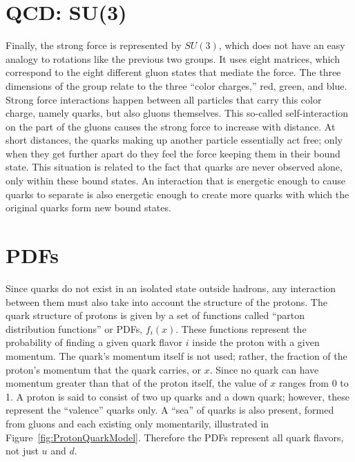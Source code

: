 \section{QCD: SU(3)}
Finally, the strong force is represented by $SU(3)$, 
which does not have an easy analogy to rotations 
like the previous two groups.  
It uses eight matrices, which correspond to the 
eight different gluon states that mediate the force.  
The three dimensions of the group relate to the 
three ``color charges,'' red, green, and blue.  
Strong force interactions happen between all particles 
that carry this color charge, 
namely quarks, but also gluons themselves.  
This so-called self-interaction on the part of the gluons 
causes the strong force to increase with distance.  
At short distances, the quarks making up another particle 
essentially act free; 
only when they get further apart do they feel the force 
keeping them in their bound state.  
This situation is related to the fact that quarks are 
never observed alone, only within these bound states.  
An interaction that is energetic enough to cause 
quarks to separate is also energetic enough to 
create more quarks with which the original quarks 
form new bound states.  


\section{PDFs}

Since quarks do not exist in an isolated state 
outside hadrons, 
any interaction between them must also take 
into account the structure of the protons.  
The quark structure of protons is given 
by a set of functions called 
``parton distribution functions'' or PDFs, 
$f_i(x)$. 
These functions represent the probability 
of finding a given quark flavor $i$ inside 
the proton with a given momentum.  
The quark's momentum itself is not used; 
rather, the fraction of the proton's 
momentum that the quark carries, or $x$. 
Since no quark can have momentum greater 
than that of the proton itself, 
the value of $x$ ranges from 0 to 1.  
A proton is said to consist of two up quarks 
and a down quark; 
however, these represent the ``valence'' quarks only.  
A ``sea'' of quarks is also present, 
formed from gluons and each existing only 
momentarily, 
illustrated in Figure~\ref{fig:ProtonQuarkModel}.  
Therefore the PDFs represent all quark 
flavors, not just $u$ and $d$.  

